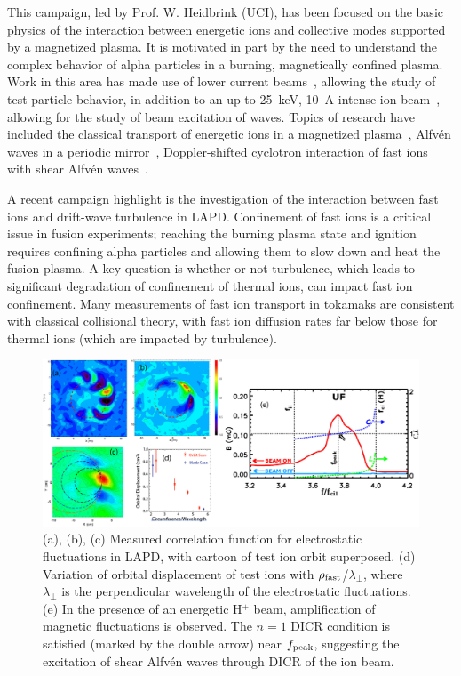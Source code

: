 \documentclass[11pt]{article}
\renewcommand{\cite}{\citep}
\begin{document}
This campaign, led by Prof. W. Heidbrink (UCI), has been focused on the basic
physics of the interaction between energetic ions and collective modes
supported by a magnetized plasma. It is motivated in part by the need to
understand the complex behavior of alpha particles in a burning,
magnetically confined plasma.  Work in this area has made use of lower
current beams~\cite{zhang:2007}, allowing the study of test particle behavior, in
addition to an up-to 25~keV, 10~A intense ion beam~\cite{tripathi:2011}, allowing for the
study of beam excitation of waves.    Topics of research have included
the classical transport of energetic ions in a magnetized
plasma~\cite{zhao:2005}, Alfv\'en waves in a periodic
mirror~\cite{zhang:2008a}, Doppler-shifted cyclotron interaction of
fast ions with shear Alfv\'{e}n waves~\cite{zhang:2008b,zhang:2009}.


A recent campaign highlight is the investigation of the interaction
between fast ions and drift-wave turbulence in LAPD.  Confinement of
fast ions is a critical issue in fusion experiments; reaching the
burning plasma state and ignition requires confining alpha particles
and allowing them to slow down and heat the fusion plasma.
 A key
question is whether or not turbulence, which leads to significant
degradation of confinement of thermal ions, can impact fast ion confinement.
Many measurements of fast ion transport in
tokamaks are consistent with classical collisional theory, with fast
ion diffusion rates far below those for thermal ions (which are
impacted by turbulence).  

\begin{figure}[!htbp]
\centerline{\includegraphics[width=6.0truein]{fastion2}}
\caption{(a), (b), (c) Measured correlation function for electrostatic
  fluctuations in LAPD, with cartoon of test ion orbit superposed. (d)
  Variation of orbital displacement of test ions with $\rho_{\rm
    fast}$/$\lambda_{\perp}$, where $\lambda_\perp$ is the
  perpendicular wavelength of the electrostatic fluctuations. (e) In the presence of an energetic H$^+$ beam, amplification of
  magnetic fluctuations is observed.  The $n = 1$ DICR
  condition is satisfied (marked by the double arrow) near $f_{\rm peak}$,
  suggesting the excitation of shear Alfv\'{e}n waves through DICR of the
  ion beam. }\label{fastion}
\end{figure}
\end{document}

